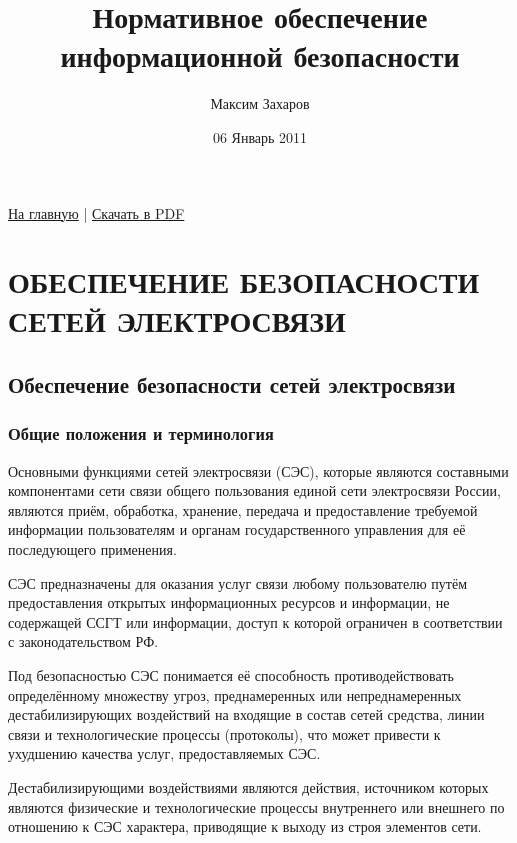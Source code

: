 \documentclass[12pt, russian, oneside, article]{ncc}
\begin{document}
\title{Нормативное обеспечение информационной безопасности}
\author{Максим Захаров}
\date{06 Январь 2011}
\maketitle

\setcounter{tocdepth}{3}
\tableofcontents
\vspace*{1cm}


\href{file:///home/maxim/Documents/Git/lectures/index.org}{На главную} | \href{file:///home/maxim/Documents/Git/lectures/other/NOIB_Lectures.pdf}{Скачать в PDF}

\section{ОБЕСПЕЧЕНИЕ БЕЗОПАСНОСТИ СЕТЕЙ ЭЛЕКТРОСВЯЗИ}
\label{sec-1}
\subsection{Обеспечение безопасности сетей электросвязи}
\label{sec-1_1}
\subsubsection{Общие положения и терминология}
\label{sec-1_1_1}


Основными функциями сетей электросвязи (СЭС), которые являются составными компонентами сети связи общего пользования единой сети электросвязи России, являются приём, обработка, хранение, передача и предоставление требуемой информации пользователям и органам государственного управления для её последующего применения.

СЭС предназначены для оказания услуг связи любому пользователю путём предоставления открытых информационных ресурсов и информации, не содержащей ССГТ или информации, доступ к которой ограничен в соответствии с законодательством РФ.

Под безопасностью СЭС понимается её способность противодействовать определённому множеству угроз, преднамеренных или непреднамеренных дестабилизирующих воздействий на входящие в состав сетей средства, линии связи и технологические процессы (протоколы), что может привести к ухудшению качества услуг, предоставляемых СЭС.

Дестабилизирующими воздействиями являются действия, источником которых являются физические и технологические процессы внутреннего или внешнего по отношению к СЭС характера, приводящие к выходу из строя элементов сети.
\end{document}
